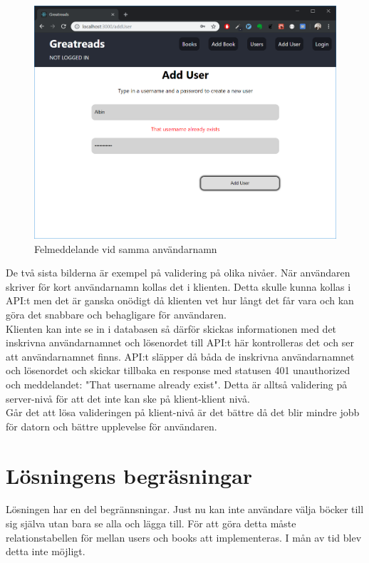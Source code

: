 \documentclass{article}
\begin{document}
\begin{figure}[H]
	\centering
	\includegraphics[width=0.8\linewidth]{Images/addUserFelMedd2.PNG}
	\caption{Felmeddelande vid samma användarnamn}
	\label{fig:name}
\end{figure}
\noindent
De två sista bilderna är exempel på validering på olika nivåer.
När användaren skriver för kort användarnamn kollas det i klienten.
Detta skulle kunna kollas i API:t men det är ganska onödigt då 
klienten vet hur långt det får vara och kan göra det snabbare och behagligare för användaren.\\

\noindent
Klienten kan inte se in i databasen så därför skickas informationen med det inskrivna användarnamnet och lösenordet till API:t här kontrolleras det och ser att användarnamnet finns. API:t släpper då båda de inskrivna användarnamnet och lösenordet och skickar tillbaka en response med statusen 401 unauthorized och meddelandet: "That username already exist".
Detta är alltså validering på server-nivå för att det inte kan ske på klient-klient nivå.\\

\noindent
Går det att lösa valideringen på klient-nivå är det bättre då det blir mindre jobb för datorn och bättre upplevelse för användaren. 

\section{Lösningens begräsningar}%
\label{sec:l_sningens_begr_sningar}
Lösningen har en del begrännsningar. Just nu kan inte användare välja böcker till sig själva utan bara se alla och lägga till. För att göra detta måste relationstabellen för mellan users och books att implementeras. I mån av tid blev detta inte möjligt.\\
\end{document}
